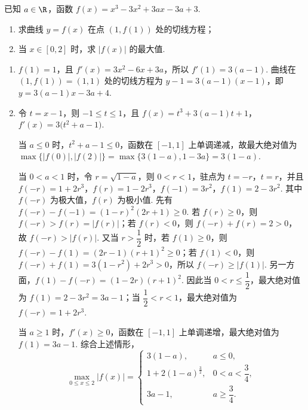 \begin{problem}
已知 \(a \in \R\)，函数 \(f(x) = x^3 - 3x^2 + 3ax - 3a + 3\).

\begin{enumerate}
\item 求曲线 \(y = f(x)\) 在点 \((1, f(1))\) 处的切线方程；
\item 当 \(x \in [0, 2]\) 时，求 \(|f(x)|\) 的最大值.
\end{enumerate}
\end{problem}

\begin{solution}
\begin{enumerate}
\item \(f(1)=1\)，且 \(f'(x)=3x^{2}-6x+3a\)，所以 \(f'(1)=3(a-1)\). 曲线在 \((1,f(1))=(1,1)\) 处的切线方程为 \(y-1=3(a-1)(x-1)\)，即 \(y=3(a-1)x-3a+4\).

\item 令 \(t=x-1\)，则 \(-1\leqslant t\leqslant1\)，且
\(f(x)=t^{3}+3(a-1)t+1\)，\(f'(x)=3\bigl(t^{2}+a-1\bigr)\).

当 \(a\leqslant0\) 时，\(t^{2}+a-1\leqslant0\)，函数在 \([-1,1]\) 上单调递减，故最大绝对值为 \(\max\{|f(0)|,|f(2)|\}=\max\{3(1-a),1-3a\}=3(1-a)\).

当 \(0<a<1\) 时，令 \(r=\sqrt{1-a}\)，则 \(0<r<1\)，驻点为 \(t=-r\)，\(t=r\)，并且 \(f(-r)=1+2r^{3}\)，\(f(r)=1-2r^{3}\)，\(f(-1)=3r^{2}\)，\(f(1)=2-3r^{2}\). 其中 \(f(-r)\) 为极大值，\(f(r)\) 为极小值. 先有 \(f(-r)-f(-1)=(1-r)^{2}(2r+1)\geqslant0\). 若 \(f(r)\geqslant0\)，则 \(f(-r)>f(r)=|f(r)|\)；若 \(f(r)<0\)，则 \(f(-r)+f(r)=2>0\)，故 \(f(-r)>|f(r)|\). 又当 \(r>\dfrac12\) 时，若 \(f(1)\geqslant0\)，则 \(f(-r)-f(1)=(2r-1)(r+1)^{2}\geqslant0\)；若 \(f(1)<0\)，则 \(f(-r)+f(1)=3(1-r^{2})+2r^{3}>0\)，所以 \(f(-r)\geqslant|f(1)|\). 另一方面，\(f(1)-f(-r)=(1-2r)(r+1)^{2}\). 因此当 \(0<r\leqslant\dfrac12\)，最大绝对值为 \(f(1)=2-3r^{2}=3a-1\)；当 \(\dfrac12<r<1\)，最大绝对值为 \(f(-r)=1+2r^{3}\).

当 \(a\geqslant1\) 时，\(f'(x)\geqslant0\)，函数在 \([-1,1]\) 上单调递增，最大绝对值为 \(f(1)=3a-1\). 综合上述情形，
\[
\max_{0\leqslant x\leqslant2}|f(x)|=
\begin{cases}
3(1-a),&a\leqslant0,\\
1+2(1-a)^{\frac32},&0<a<\dfrac34,\\
3a-1,&a\geqslant\dfrac34.
\end{cases}
\]
\end{enumerate}
\end{solution}
